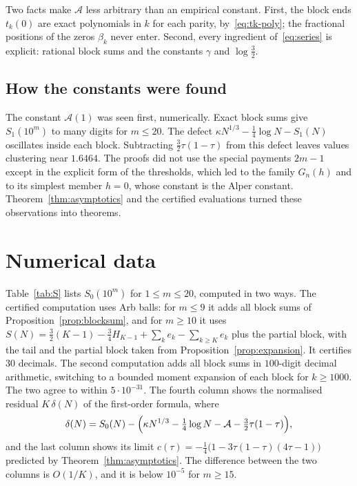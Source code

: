 \documentclass[11pt]{article}
\theoremstyle{definition}
\theoremstyle{remark}
\newcommand{\Alp}{\mathcal{A}}
\begin{document}
Two facts make $\Alp$ less arbitrary than an empirical constant. First,
the block ends $t_k(0)$ are exact polynomials in $k$ for each parity,
by~\eqref{eq:tk-poly}; the fractional positions of the zeros $\beta_k$
never enter. Second, every ingredient of~\eqref{eq:series} is explicit:
rational block sums and the constants $\gamma$ and $\log\frac32$.

\subsection*{How the constants were found}

The constant $\Alp(1)$ was seen first, numerically. Exact block sums give
$S_1(10^m)$ to many digits for $m\le20$. The defect
$\kappa N^{1/3}-\frac14\log N-S_1(N)$ oscillates inside each block.
Subtracting $\frac32\tau(1-\tau)$ from this defect leaves values
clustering near $1.6464$. The proofs did not use the special payments $2m-1$ except
in the explicit form of the thresholds, which led to the family $G_n(h)$
and to its simplest member $h=0$, whose constant is the Alper constant.
Theorem~\ref{thm:asymptotics} and the certified evaluations turned these
observations into theorems.

\section{Numerical data}\label{sec:numerics}

Table~\ref{tab:S} lists $S_0(10^m)$ for $1\le m\le20$, computed in two
ways. The certified computation uses Arb balls: for $m\le9$ it adds all
block sums of Proposition~\ref{prop:blocksum}, and for $m\ge10$ it uses
$S(N)=\frac32(K-1)-\frac34H_{K-1}+\sum_ke_k-\sum_{k\ge K}e_k$ plus the
partial block, with the tail and the partial block taken from
Proposition~\ref{prop:expansion}. It certifies $30$ decimals. The second
computation adds all block sums in $100$-digit decimal arithmetic,
switching to a bounded moment expansion of each block for $k\ge1000$.
The two agree to within $5\cdot10^{-31}$. The
fourth column shows the normalised residual $K\,\delta(N)$ of the
first-order formula, where
\[
\delta(N)=S_0(N)-\Bigl(\kappa N^{1/3}-\tfrac14\log N-\Alp
-\tfrac32\tau(1-\tau)\Bigr),
\]
and the last column shows its limit
$c(\tau)=-\frac14\bigl(1-3\tau(1-\tau)(4\tau-1)\bigr)$ predicted by
Theorem~\ref{thm:asymptotics}. The difference between the two columns is
$O(1/K)$, and it is below $10^{-5}$ for $m\ge15$.
\end{document}

